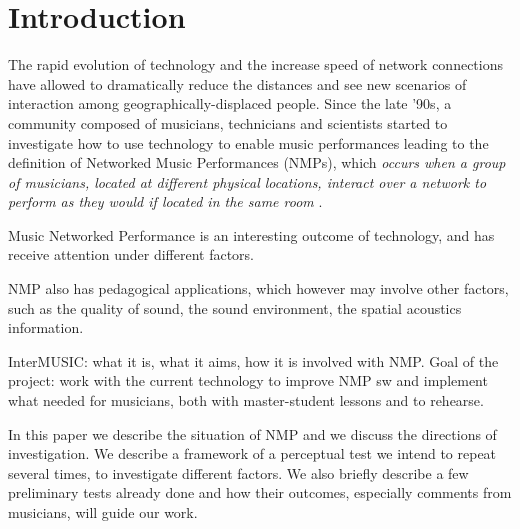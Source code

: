 
\section{Introduction}\label{sec:introduction}

The rapid evolution of technology and the increase speed of network connections have allowed to dramatically reduce the distances and see new scenarios of interaction among geogra\-phically-displaced people. Since the late '90s, a community composed of musicians, technicians and  scientists started to investigate how to use technology to enable music performances leading to the definition of Networked Music Performances (NMPs), which \textit{occurs when a group of musicians, located at different physical locations, interact over a network to perform as they would if located in the same room} \cite{Lazzaro2001}.

Music Networked Performance is an interesting outcome of technology, and has receive attention under different factors.

NMP also has pedagogical applications, which however may involve other factors, such as the quality of sound, the sound environment, the spatial acoustics information. 

InterMUSIC: what it is, what it aims, how it is involved with NMP.
Goal of the project: work with the current technology to improve NMP sw and implement what needed for musicians, both with master-student lessons and to rehearse.

In this paper we describe the situation of NMP and we discuss the directions of investigation. We describe a framework of a perceptual test we intend to repeat several times, to investigate different factors. We also briefly describe a few preliminary tests already done and how their outcomes, especially comments from musicians, will guide our work.








